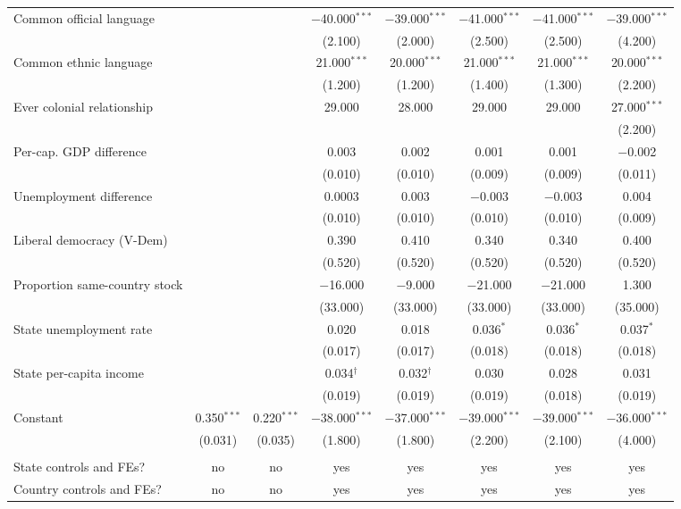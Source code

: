 \documentclass[
  11pt,
]{article}
\begin{document}
\begin{table}[H]
\begin{tabular}{@{\extracolsep{2pt}}lccccccc}
  Common official language &  &  & $-$40.000$^{***}$ & $-$39.000$^{***}$ & $-$41.000$^{***}$ & $-$41.000$^{***}$ & $-$39.000$^{***}$ \\ 
  &  &  & (2.100) & (2.000) & (2.500) & (2.500) & (4.200) \\ 
  Common ethnic language &  &  & 21.000$^{***}$ & 20.000$^{***}$ & 21.000$^{***}$ & 21.000$^{***}$ & 20.000$^{***}$ \\ 
  &  &  & (1.200) & (1.200) & (1.400) & (1.300) & (2.200) \\ 
  Ever colonial relationship &  &  & 29.000 & 28.000 & 29.000 & 29.000 & 27.000$^{***}$ \\ 
  &  &  &  &  &  &  & (2.200) \\ 
  Per-cap. GDP difference &  &  & 0.003 & 0.002 & 0.001 & 0.001 & $-$0.002 \\ 
  &  &  & (0.010) & (0.010) & (0.009) & (0.009) & (0.011) \\ 
  Unemployment difference &  &  & 0.0003 & 0.003 & $-$0.003 & $-$0.003 & 0.004 \\ 
  &  &  & (0.010) & (0.010) & (0.010) & (0.010) & (0.009) \\ 
  Liberal democracy (V-Dem) &  &  & 0.390 & 0.410 & 0.340 & 0.340 & 0.400 \\ 
  &  &  & (0.520) & (0.520) & (0.520) & (0.520) & (0.520) \\ 
  Proportion same-country stock &  &  & $-$16.000 & $-$9.000 & $-$21.000 & $-$21.000 & 1.300 \\ 
  &  &  & (33.000) & (33.000) & (33.000) & (33.000) & (35.000) \\ 
  State unemployment rate &  &  & 0.020 & 0.018 & 0.036$^{*}$ & 0.036$^{*}$ & 0.037$^{*}$ \\ 
  &  &  & (0.017) & (0.017) & (0.018) & (0.018) & (0.018) \\ 
  State per-capita income &  &  & 0.034$^{†}$ & 0.032$^{†}$ & 0.030 & 0.028 & 0.031 \\ 
  &  &  & (0.019) & (0.019) & (0.019) & (0.018) & (0.019) \\ 
  Constant & 0.350$^{***}$ & 0.220$^{***}$ & $-$38.000$^{***}$ & $-$37.000$^{***}$ & $-$39.000$^{***}$ & $-$39.000$^{***}$ & $-$36.000$^{***}$ \\ 
  & (0.031) & (0.035) & (1.800) & (1.800) & (2.200) & (2.100) & (4.000) \\ 
 \hline \\[-1.8ex] 
State controls and FEs? & no & no & yes & yes & yes & yes & yes \\ 
Country controls and FEs? & no & no & yes & yes & yes & yes & yes \\ 

\end{tabular}
\end{table}
\end{document}
